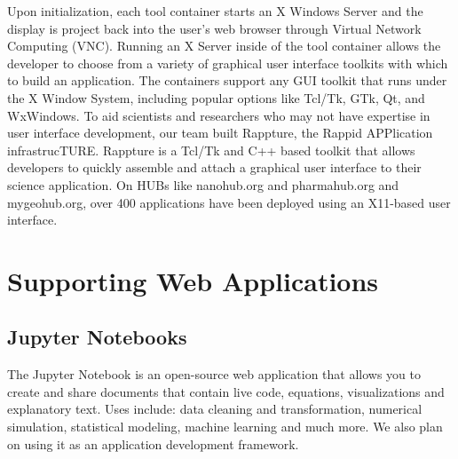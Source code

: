\documentclass[conference]{../sty/IEEEtran}
\begin{document}
Upon initialization, each tool container starts an X Windows Server and the
display is project back into the user's web browser through Virtual Network
Computing (VNC).  Running an X Server inside of the tool container allows the
developer to choose from a variety of graphical user interface toolkits with
which to build an application. The containers support any GUI toolkit that runs
under the X Window System, including popular options like Tcl/Tk, GTk, Qt, and
WxWindows.  To aid scientists and researchers who may not have expertise in
user interface development, our team built Rappture, the Rappid APPlication
infrastrucTURE.  Rappture is a Tcl/Tk and C++ based toolkit that allows
developers to quickly assemble and attach a graphical user interface to their
science application. On HUBs like nanohub.org and pharmahub.org and
mygeohub.org, over 400 applications have been deployed using an X11-based user
interface.




%



\section {Supporting Web Applications}

\subsection {Jupyter Notebooks}
The Jupyter Notebook is an open-source web application that allows you to create and share documents that contain live code, equations, visualizations and explanatory text. Uses include: data cleaning and transformation, numerical simulation, statistical modeling, machine learning and much more. We also plan on using it as an application development framework.
\end{document}
